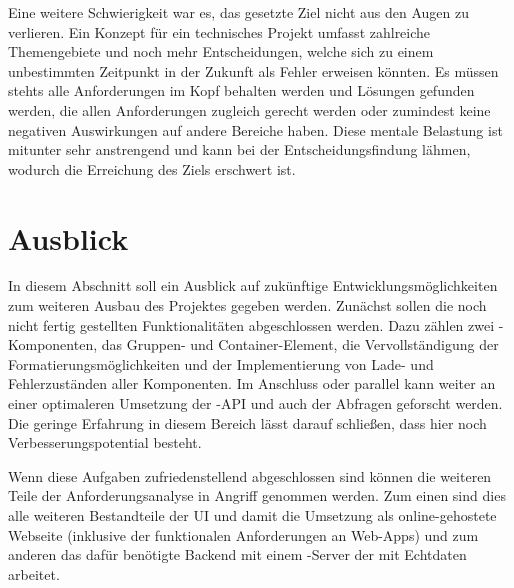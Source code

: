 Eine weitere Schwierigkeit war es, das gesetzte Ziel nicht aus den Augen zu verlieren. Ein Konzept für ein technisches Projekt umfasst zahlreiche Themengebiete und noch mehr Entscheidungen, welche sich zu einem unbestimmten Zeitpunkt in der Zukunft als Fehler erweisen könnten. Es müssen stehts alle Anforderungen im Kopf behalten werden und Lösungen gefunden werden, die allen Anforderungen zugleich gerecht werden oder zumindest keine negativen Auswirkungen auf andere Bereiche haben. Diese mentale Belastung ist mitunter sehr anstrengend und kann bei der Entscheidungsfindung lähmen, wodurch die Erreichung des Ziels erschwert ist.

\section{Ausblick}
In diesem Abschnitt soll ein Ausblick auf zukünftige Entwicklungsmöglichkeiten zum weiteren Ausbau des Projektes gegeben werden. Zunächst sollen die noch nicht fertig gestellten Funktionalitäten abgeschlossen werden. Dazu zählen zwei -Komponenten, das Gruppen- und Container-Element, die Vervollständigung der Formatierungsmöglichkeiten und der Implementierung von Lade- und Fehlerzuständen aller Komponenten.
Im Anschluss oder parallel kann weiter an einer optimaleren Umsetzung der -API und auch der Abfragen geforscht werden. Die geringe Erfahrung in diesem Bereich lässt darauf schließen, dass hier noch Verbesserungspotential besteht.

Wenn diese Aufgaben zufriedenstellend abgeschlossen sind können die weiteren Teile der Anforderungsanalyse in Angriff genommen werden. Zum einen sind dies alle weiteren Bestandteile der UI und damit die Umsetzung als online-gehostete Webseite (inklusive der funktionalen Anforderungen an Web-Apps) und zum anderen das dafür benötigte Backend mit einem -Server der mit Echtdaten arbeitet.
